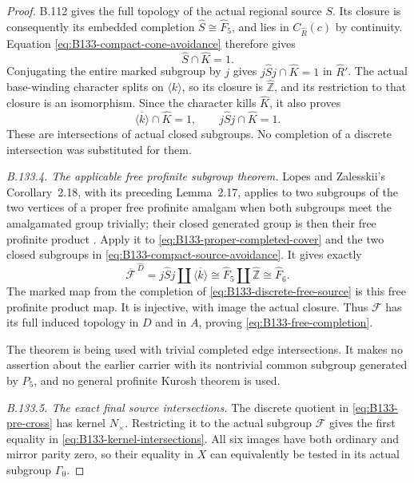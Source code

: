 \begin{proof}
B.112 gives the full topology of the actual regional source $S$.
Its closure is consequently its embedded completion
$\widehat S\cong\widehat F_5$, and lies in
$C_{\widehat R}(c)$ by continuity. Equation
\eqref{eq:B133-compact-cone-avoidance} therefore gives
\[
 \widehat S\cap\widehat K=1.
\]
Conjugating the entire marked subgroup by $j$ gives
$j\widehat Sj\cap\widehat K=1$ in $\widehat R'$.
The actual base-winding character splits on $\langle k\rangle$,
so its closure is $\widehat{\mathbb Z}$, and its restriction to
that closure is an isomorphism. Since the character kills
$\widehat K$, it also proves
\begin{equation}\label{eq:B133-compact-source-avoidance}
 \overline{\langle k\rangle}\cap\widehat K=1,
 \qquad j\widehat Sj\cap\widehat K=1.
\end{equation}
These are intersections of actual closed subgroups. No completion
of a discrete intersection was substituted for them.

\emph{B.133.4. The applicable free profinite subgroup theorem.}
Lopes and Zalesskii's Corollary~2.18, with its preceding
Lemma~2.17, applies to two subgroups of the two vertices of a
proper free profinite amalgam when both subgroups meet the
amalgamated group trivially; their closed generated group is then
their free profinite product \cite[Corollary~2.18]{BLopesZalesskii2025}.
Apply it to \eqref{eq:B133-proper-completed-cover} and the two
closed subgroups in \eqref{eq:B133-compact-source-avoidance}.
It gives exactly
\[
 \overline{\mathscr F}^{\,\widehat D}
    =j\widehat Sj\amalg\overline{\langle k\rangle}
    \cong\widehat F_5\amalg\widehat{\mathbb Z}
    \cong\widehat F_6.
\]
The marked map from the completion of
\eqref{eq:B133-discrete-free-source} is this free profinite
product map. It is injective, with image the actual closure.
Thus $\mathscr F$ has its full induced topology in $D$ and in
$A$, proving \eqref{eq:B133-free-completion}.

The theorem is being used with trivial completed edge
intersections. It makes no assertion about the earlier carrier
with its nontrivial common subgroup generated by $P_5$, and no
general profinite Kurosh theorem is used.

\emph{B.133.5. The exact final source intersections.}
The discrete quotient in \eqref{eq:B133-pre-cross} has kernel
$N_\times$. Restricting it to the actual subgroup
$\mathscr F$ gives the first equality in
\eqref{eq:B133-kernel-intersections}. All six images have both
ordinary and mirror parity zero, so their equality in $X$ can
equivalently be tested in its actual subgroup $\Gamma_0$.


\end{proof}
